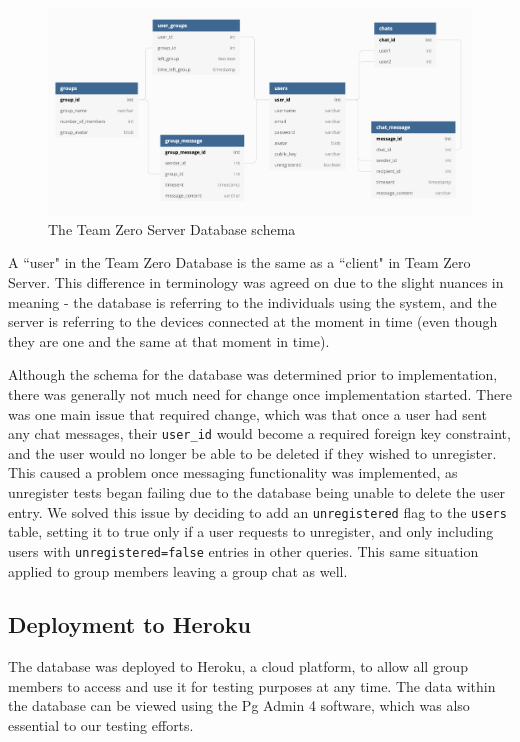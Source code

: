 \begin{figure}[H]
  \includegraphics[width=\linewidth]{images/db.png}
  \caption{The Team Zero Server Database schema}
  \label{db-schema}
\end{figure}

A ``user" in the Team Zero Database is the same as a ``client" in Team Zero Server. This difference in terminology was agreed on due to the slight nuances in meaning - the database is referring to the individuals using the system, and the server is referring to the devices connected at the moment in time (even though they are one and the same at that moment in time).

Although the schema for the database was determined prior to implementation, there was generally not much need for change once implementation started. There was one main issue that required change, which was that once a user had sent any chat messages, their \verb|user_id| would become a required foreign key constraint, and the user would no longer be able to be deleted if they wished to unregister. This caused a problem once messaging functionality was implemented, as unregister tests began failing due to the database being unable to delete the user entry. We solved this issue by deciding to add an \verb|unregistered| flag to the \verb|users| table, setting it to true only if a user requests to unregister, and only including users with \verb|unregistered=false| entries in other queries. This same situation applied to group members leaving a group chat as well.


\subsection{Deployment to Heroku}

The database was deployed to Heroku, a cloud platform, to allow all group members to access and use it for testing purposes at any time. The data within the database can be viewed using the Pg Admin 4 software, which was also essential to our testing efforts.

